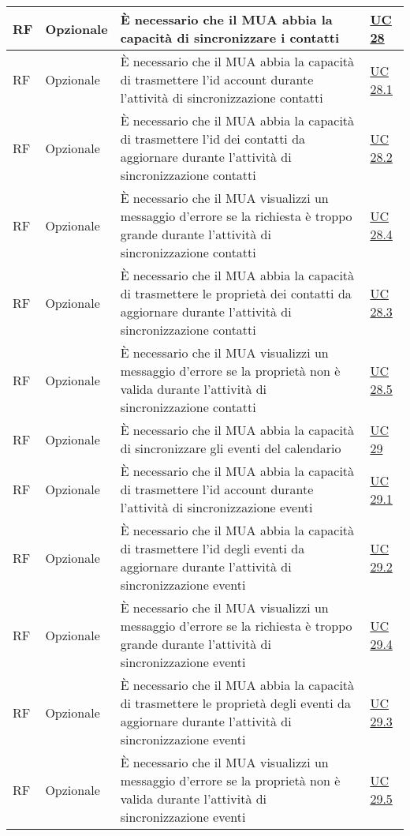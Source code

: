\begin{longtable}{*{1}{>{\centering\arraybackslash}p{1.5cm}}*{1}{>{\centering\arraybackslash}p{2.5cm}}p{6cm}*{1}{>{\centering\arraybackslash}p{3cm}}}
    \\\hline
    RF & Opzionale & È necessario che il MUA abbia la capacità di sincronizzare i contatti & \hyperref[sec:UC28]{UC 28}
    \\\hline
    RF & Opzionale & È necessario che il MUA abbia la capacità di trasmettere l'id account durante l'attività di sincronizzazione contatti & \hyperref[sec:UC28.1]{UC 28.1}
    \\\hline
    RF & Opzionale & È necessario che il MUA abbia la capacità di trasmettere l'id dei contatti da aggiornare durante l'attività di sincronizzazione contatti & \hyperref[sec:UC28.2]{UC 28.2}
    \\\hline
    RF & Opzionale & È necessario che il MUA visualizzi un messaggio d'errore se la richiesta è troppo grande durante l'attività di sincronizzazione contatti & \hyperref[sec:UC28.4]{UC 28.4}
    \\\hline
    RF & Opzionale & È necessario che il MUA abbia la capacità di trasmettere le proprietà dei contatti da aggiornare durante l'attività di sincronizzazione contatti & \hyperref[sec:UC28.3]{UC 28.3}
    \\\hline
    RF & Opzionale & È necessario che il MUA visualizzi un messaggio d'errore se la proprietà non è valida durante l'attività di sincronizzazione contatti & \hyperref[sec:UC28.5]{UC 28.5}
    \\\hline
    RF & Opzionale & È necessario che il MUA abbia la capacità di sincronizzare gli eventi del calendario & \hyperref[sec:UC29]{UC 29}
    \\\hline
    RF & Opzionale & È necessario che il MUA abbia la capacità di trasmettere l'id account durante l'attività di sincronizzazione eventi & \hyperref[sec:UC29.1]{UC 29.1}
    \\\hline
    RF & Opzionale & È necessario che il MUA abbia la capacità di trasmettere l'id degli eventi da aggiornare durante l'attività di sincronizzazione eventi & \hyperref[sec:UC29.2]{UC 29.2}
    \\\hline
    RF & Opzionale & È necessario che il MUA visualizzi un messaggio d'errore se la richiesta è troppo grande durante l'attività di sincronizzazione eventi & \hyperref[sec:UC29.4]{UC 29.4}
    \\\hline
    RF & Opzionale & È necessario che il MUA abbia la capacità di trasmettere le proprietà degli eventi da aggiornare durante l'attività di sincronizzazione eventi & \hyperref[sec:UC29.3]{UC 29.3}
    \\\hline
    RF & Opzionale & È necessario che il MUA visualizzi un messaggio d'errore se la proprietà non è valida durante l'attività di sincronizzazione eventi & \hyperref[sec:UC29.5]{UC 29.5}
    \\\hline
    \end{longtable}


